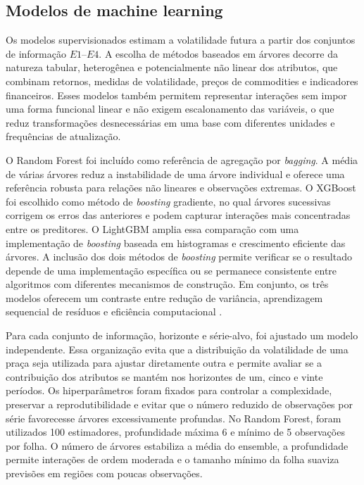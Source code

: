 \documentclass[a4paper,fleqn]{cas-sc}
\begin{document}
\subsection{Modelos de machine learning}
\label{subsec:ml_models}

Os modelos supervisionados estimam a volatilidade futura a partir dos conjuntos de informação \(E1\)--\(E4\). A escolha de métodos baseados em árvores decorre da natureza tabular, heterogênea e potencialmente não linear dos atributos, que combinam retornos, medidas de volatilidade, preços de commodities e indicadores financeiros. Esses modelos também permitem representar interações sem impor uma forma funcional linear e não exigem escalonamento das variáveis, o que reduz transformações desnecessárias em uma base com diferentes unidades e frequências de atualização.

O Random Forest foi incluído como referência de agregação por \textit{bagging}. A média de várias árvores reduz a instabilidade de uma árvore individual e oferece uma referência robusta para relações não lineares e observações extremas. O XGBoost foi escolhido como método de \textit{boosting} gradiente, no qual árvores sucessivas corrigem os erros das anteriores e podem capturar interações mais concentradas entre os preditores. O LightGBM amplia essa comparação com uma implementação de \textit{boosting} baseada em histogramas e crescimento eficiente das árvores. A inclusão dos dois métodos de \textit{boosting} permite verificar se o resultado depende de uma implementação específica ou se permanece consistente entre algoritmos com diferentes mecanismos de construção. Em conjunto, os três modelos oferecem um contraste entre redução de variância, aprendizagem sequencial de resíduos e eficiência computacional \citep{Breiman2001RandomForest,ChenGuestrin2016XGBoost,Ke2017LightGBM}.

Para cada conjunto de informação, horizonte e série-alvo, foi ajustado um modelo independente. Essa organização evita que a distribuição da volatilidade de uma praça seja utilizada para ajustar diretamente outra e permite avaliar se a contribuição dos atributos se mantém nos horizontes de um, cinco e vinte períodos. Os hiperparâmetros foram fixados para controlar a complexidade, preservar a reprodutibilidade e evitar que o número reduzido de observações por série favorecesse árvores excessivamente profundas. No Random Forest, foram utilizados 100 estimadores, profundidade máxima 6 e mínimo de 5 observações por folha. O número de árvores estabiliza a média do ensemble, a profundidade permite interações de ordem moderada e o tamanho mínimo da folha suaviza previsões em regiões com poucas observações.
\end{document}
